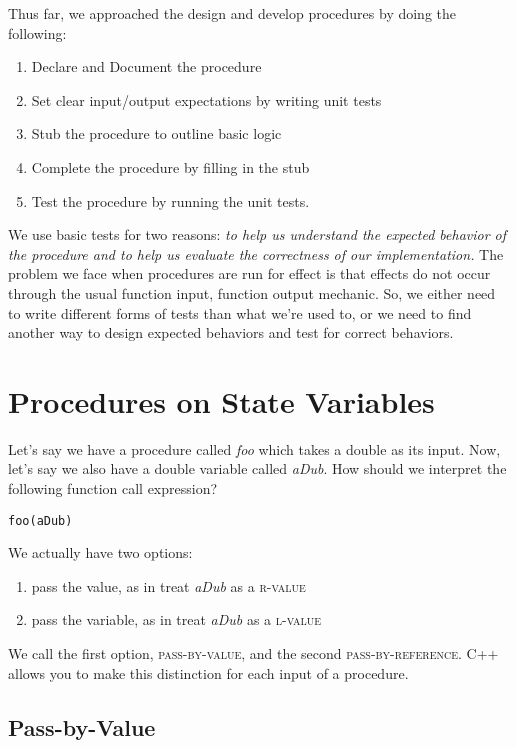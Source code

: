 \documentclass[]{tufte-handout}
\begin{document}
Thus far, we approached the design and develop procedures by doing the following:
\begin{enumerate}
\item Declare and Document the procedure
\item Set clear input/output expectations by writing unit tests
\item Stub the procedure to outline basic logic
\item Complete the procedure by filling in the stub
\item Test the procedure by running the unit tests.
\end{enumerate}
We use basic tests for two reasons: \textit{to help us understand the expected behavior of the procedure and to help us evaluate the correctness of our implementation.} The problem we face when procedures are run for effect is that effects do not occur through the usual function input, function output mechanic.  So, we either need to write different forms of tests than what we're used to, or we need to find another way to design expected behaviors and test for correct behaviors.

\section{Procedures on State Variables}

Let's say we have a procedure called \textit{foo} which takes a double as its input. Now, let's say we also have a double variable called \textit{aDub}. How should we interpret the following function call expression?
\begin{verbatim}
foo(aDub)
\end{verbatim}
We actually have two options:
\begin{enumerate}
\item pass the value, as in treat \textit{aDub} as a \textsc{r-value}
\item pass the variable, as in treat \textit{aDub} as a \textsc{l-value}
\end{enumerate}
We call the first option, \textsc{pass-by-value}, and the second \textsc{pass-by-reference}.  C++ allows you to make this distinction for each input of a procedure. 

\subsection{Pass-by-Value}
\end{document}
